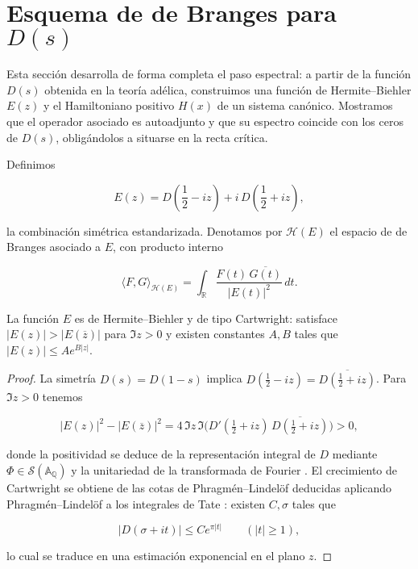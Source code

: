 \section{Esquema de de Branges para $D(s)$}

Esta sección desarrolla de forma completa el paso espectral: a partir de la
función $D(s)$ obtenida en la teoría adélica, construimos una función de
Hermite--Biehler $E(z)$ y el Hamiltoniano positivo $H(x)$ de un sistema canónico.
Mostramos que el operador asociado es autoadjunto y que su espectro coincide con
los ceros de $D(s)$, obligándolos a situarse en la recta crítica.

\begin{definition}
Definimos

\[
 E(z)=D\!\left(\frac{1}{2}-iz\right)+i\,D\!\left(\frac{1}{2}+iz\right),
\]

la combinación simétrica estandarizada.  Denotamos por
$\mathcal{H}(E)$ el espacio de de Branges asociado a $E$, con producto interno

\[
 \langle F,G\rangle_{\mathcal{H}(E)}
 =\int_{\mathbb{R}} \frac{F(t)\,\overline{G(t)}}{|E(t)|^2}\,dt.
\]
\end{definition}

\begin{lemma}\label{lem:HB}
La función $E$ es de Hermite--Biehler y de tipo Cartwright: satisface
$|E(z)|>|E(\overline{z})|$ para $\Im z>0$ y existen constantes $A,B$ tales que
$|E(z)|\leqslant A e^{B|z|}$.
\end{lemma}

\begin{proof}
La simetría $D(s)=D(1-s)$ implica
$D\!\left(\tfrac{1}{2}-iz\right)=\overline{D\!\left(\tfrac{1}{2}+iz\right)}$.  Para $\Im z>0$ tenemos

\[
 |E(z)|^2-|E(\overline{z})|^2
 =4\,\Im z\,\Im\bigl(D'(\tfrac{1}{2}+iz)\,\overline{D(\tfrac{1}{2}+iz)}\bigr)>0,
\]

donde la positividad se deduce de la representación integral de $D$ mediante
$\Phi \in \mathcal{S}(\mathbb{A}_\mathbb{Q})$ y la unitariedad de la transformada
de Fourier \cite{Tate1967}.  El crecimiento de Cartwright se obtiene de las cotas
de Phragmén--Lindelöf deducidas aplicando Phragmén--Lindelöf a los integrales de Tate \cite{Tate1967}: existen $C,\sigma$ tales que

\[
 |D(\sigma+it)|\leqslant C e^{\pi |t|}\qquad (|t|\geqslant1),
\]

lo cual se traduce en una estimación exponencial en el plano $z$.
\end{proof}

